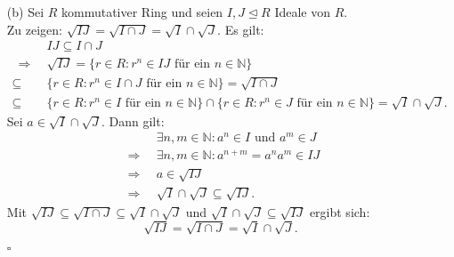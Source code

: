 \documentclass[12pt]{article}
\newcommand{\QED}{\begin{flushright} $\square$ \end{flushright}}
\newcommand{\df}{\enspace\Longrightarrow\enspace}
\newcommand{\isIdeal}{\trianglelefteq}
\begin{document}
\begin{enumerate}
	\item[(b)] Sei $R$ kommutativer Ring und seien $I,J\isIdeal R$ Ideale von $R$. \\
	Zu zeigen: $\sqrt{IJ}=\sqrt{I\cap J}=\sqrt{I}\cap\sqrt{J}$.
	Es gilt:
	\begin{align*}
		&IJ\subseteq I\cap J \\
		\df &\sqrt{IJ} = \{r\in R:r^n\in IJ\text{ für ein }n\in\mathbb{N}\} \\
		\subseteq&\{r\in R:r^n\in I\cap J\text{ für ein }n\in\mathbb{N}\}=\sqrt{I\cap J} \\
		\subseteq&\{r\in R:r^n\in I\text{ für ein }n\in\mathbb{N}\}\cap\{r\in R:r^n\in J\text{ für ein }n\in\mathbb{N}\}=\sqrt{I}\cap\sqrt{J}.
	\end{align*}
	Sei $a\in\sqrt{I}\cap\sqrt{J}$.	Dann gilt:
	\begin{align*}
		&\exists n,m\in\mathbb{N}:a^n\in I\text{ und }a^m\in J \\
		\df &\exists n,m\in\mathbb{N}:a^{n+m}=a^na^m\in IJ \\
		\df &a\in\sqrt{IJ} \\
		\df &\sqrt{I}\cap\sqrt{J}\subseteq\sqrt{IJ}.
	\end{align*}
	Mit $\sqrt{IJ}\subseteq\sqrt{I\cap J}\subseteq\sqrt{I}\cap\sqrt{J}$ und $\sqrt{I}\cap\sqrt{J}\subseteq\sqrt{IJ}$ ergibt sich:
	$$\sqrt{IJ}=\sqrt{I\cap J}=\sqrt{I}\cap\sqrt{J}.$$
	\QED
\end{enumerate}
\end{document}
